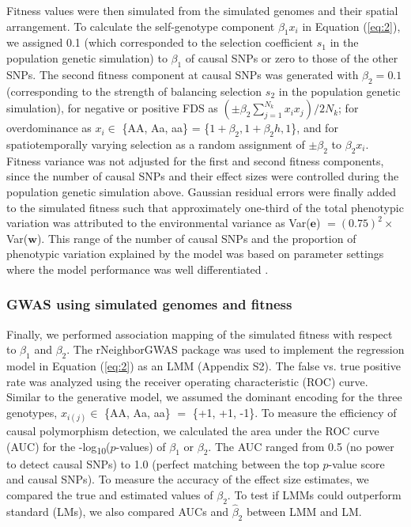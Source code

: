 \documentclass[12pt,]{article}
\begin{document}
Fitness values were then simulated from the simulated genomes and their spatial arrangement. To calculate the self-genotype component $\beta_1x_i$ in Equation (\ref{eq:2}), we assigned 0.1 (which corresponded to the selection coefficient $s_1$ in the population genetic simulation) to $\beta_1$ of causal SNPs or zero to those of the other SNPs. The second fitness component at causal SNPs was generated with $\beta_2 = 0.1$ (corresponding to the strength of balancing selection $s_2$ in the population genetic simulation), for negative or positive FDS as $(\pm \beta_2\sum^{N_{k}}_{j=1}{x_ix_j}) / 2N_k$; for overdominance as $x_i \in$ \{AA, Aa, aa\} = \{$1+\beta_2, 1+\beta_2h, 1$\}, and for spatiotemporally varying selection as a random assignment of $\pm \beta_2$ to $\beta_2x_i$. Fitness variance was not adjusted for the first and second fitness components, since the number of causal SNPs and their effect sizes were controlled during the population genetic simulation above. Gaussian residual errors were finally added to the simulated fitness such that approximately one-third of the total phenotypic variation was attributed to the environmental variance as Var($\mathbf{e}$) $=(0.75)^2 \times$Var($\mathbf{w}$). This range of the number of causal SNPs and the proportion of phenotypic variation explained by the model was based on parameter settings where the model performance was well differentiated \citep{sato2019neighbor}.

\subsubsection{GWAS using simulated genomes and fitness}
Finally, we performed association mapping of the simulated fitness with respect to $\beta_1$ and $\beta_2$. The rNeighborGWAS package \citep{sato2019neighbor} was used to implement the regression model in Equation (\ref{eq:2}) as an LMM (Appendix S2). The false vs. true positive rate was analyzed using the receiver operating characteristic (ROC) curve. Similar to the generative model, we assumed the dominant encoding for the three genotypes, $x_{i(j)} \in$ \{AA, Aa, aa\} $=$ \{+1, +1, -1\}. To measure the efficiency of causal polymorphism detection, we calculated the area under the ROC curve (AUC) for the -log\textsubscript{10}($p$-values) of $\beta_1$ or $\beta_2$. The AUC ranged from 0.5 (no power to detect causal SNPs) to 1.0 (perfect matching between the top $p$-value score and causal SNPs). To measure the accuracy of the effect size estimates, we compared the true and estimated values of $\beta_2$. To test if LMMs could outperform standard (LMs), we also compared AUCs and $\hat{\beta}_2$ between LMM and LM.
\end{document}
